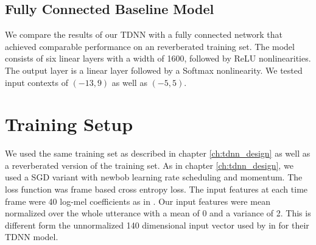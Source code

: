 \begin{minipage}{\linewidth}
	\label{fig:final_tdnn}
	\vspace{5mm}
\end{minipage}
\subsection{Fully Connected Baseline Model}
We compare the results of our TDNN with a fully connected network that achieved comparable performance on an reverberated training set. The model consists of six linear layers with a width of 1600, followed by ReLU nonlinearities. The output layer is a linear layer followed by a Softmax nonlinearity. We tested input contexts of $(-13, 9)$ as well as $(-5, 5)$.
\section{Training Setup}
We used the same training set as described in chapter \ref{ch:tdnn_design} as well as a reverberated version of the training set. As in chapter \ref{ch:tdnn_design}, we used a SGD variant with newbob learning rate scheduling and momentum. The loss function was frame based cross entropy loss. The input features at each time frame were 40 log-mel coefficients as in \cite{nguyen20162016}. Our input features were mean normalized over the whole utterance with a mean of 0 and a variance of 2. This is different form the unnormalized 140 dimensional input vector used by \cite{peddinti2015reverberation} in \cite{peddinti2015jhu} for their TDNN model.
